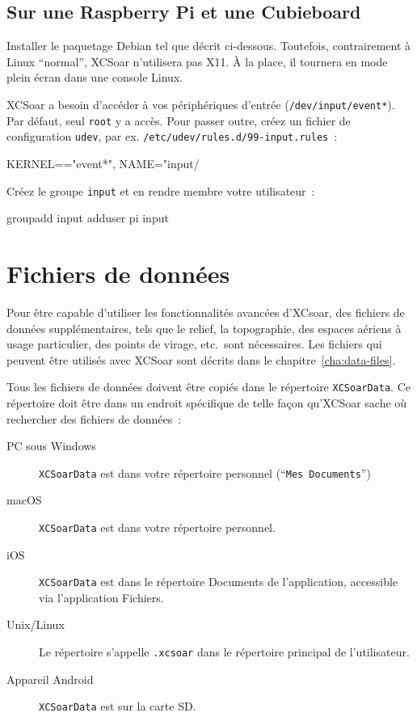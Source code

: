 \subsection*{Sur une Raspberry Pi et une Cubieboard}

Installer le paquetage Debian tel que décrit ci-dessous. Toutefois, contrairement à 
Linux ``normal'', XCSoar n'utilisera pas X11. À la place, il tournera
en mode plein écran dans une console Linux.

XCSoar a besoin d'accéder à vos périphériques d'entrée
(\texttt{/dev/input/event*}). Par défaut, seul \texttt{root} y
a accès. Pour passer outre, créez un fichier de configuration
\texttt{udev}, par ex. \texttt{/etc/udev/rules.d/99-input.rules}~:

\begin{verbatim*}
KERNEL=="event*", NAME="input/%
\end{verbatim*}

Créez le groupe \texttt{input} et en rendre membre votre utilisateur~:

\begin{verbatim*}
groupadd input
adduser pi input
\end{verbatim*}

\section{Fichiers de données}\label{sec:data files}

Pour être capable d'utiliser les fonctionnalités avancées d'XCsoar, des fichiers de données supplémentaires, tels que
le relief, la topographie, des espaces aériens à usage particulier, des points de virage, etc.\, sont nécessaires. Les fichiers
qui peuvent être utilisés avec XCSoar sont décrits dans le chapitre~\ref{cha:data-files}.

Tous les fichiers de données doivent être copiés dans le répertoire 
\texttt{XCSoarData}. Ce répertoire doit être dans un endroit spécifique
de telle façon qu'XCSoar sache où rechercher des fichiers de données~:
\begin{description}
\item[PC sous Windows]
\texttt{XCSoarData} est dans votre répertoire personnel (``\texttt{Mes
Documents}'')
\item[macOS]
\texttt{XCSoarData} est dans votre répertoire personnel.
\item[iOS]
\texttt{XCSoarData} est dans le répertoire Documents de l'application,
accessible via l'application Fichiers.
\item[Unix/Linux]
Le répertoire s'appelle \verb|.xcsoar| dans le répertoire principal de l'utilisateur.
\item[Appareil Android]
\texttt{XCSoarData} est sur la carte SD.
\end{description}

